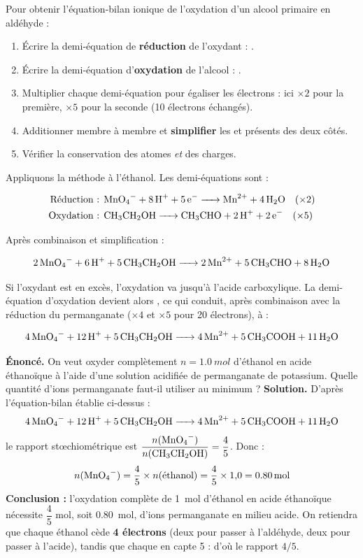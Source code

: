 \documentclass[11pt]{article}
\begin{document}
\begin{methode}
Pour obtenir l'équation-bilan ionique de l'oxydation d'un alcool primaire en aldéhyde :
\begin{enumerate}
\item Écrire la demi-équation de \textbf{réduction} de l'oxydant : .
\item Écrire la demi-équation d'\textbf{oxydation} de l'alcool : .
\item Multiplier chaque demi-équation pour égaliser les électrons : ici $\times 2$ pour la première, $\times 5$ pour la seconde (10 électrons échangés).
\item Additionner membre à membre et \textbf{simplifier} les  et  présents des deux côtés.
\item Vérifier la conservation des atomes \emph{et} des charges.
\end{enumerate}
\end{methode}

Appliquons la méthode à l'éthanol. Les demi-équations sont :

\begin{align*}
\text{Réduction : } & \ce{MnO4- + 8H+ + 5e- -> Mn^2+ + 4H2O} \quad (\times 2)\\
\text{Oxydation : } & \ce{CH3CH2OH -> CH3CHO + 2H+ + 2e-} \quad (\times 5)
\end{align*}

Après combinaison et simplification :

\[ \ce{2MnO4- + 6H+ + 5CH3CH2OH -> 2Mn^2+ + 5CH3CHO + 8H2O} \]

Si l'oxydant est en excès, l'oxydation va jusqu'à l'acide carboxylique. La demi-équation d'oxydation devient alors , ce qui conduit, après combinaison avec la réduction du permanganate ($\times 4$ et $\times 5$ pour 20 électrons), à :

\[ \ce{4MnO4- + 12H+ + 5CH3CH2OH -> 4Mn^2+ + 5CH3COOH + 11H2O} \]

\begin{exoresolu}
\textbf{Énoncé.} On veut oxyder complètement $n = \SI{1,0}{mol}$ d'éthanol en acide éthanoïque à l'aide d'une solution acidifiée de permanganate de potassium. Quelle quantité d'ions permanganate  faut-il utiliser au minimum ?
\tcblower
\textbf{Solution.} D'après l'équation-bilan établie ci-dessus :
\[ \ce{4MnO4- + 12H+ + 5CH3CH2OH -> 4Mn^2+ + 5CH3COOH + 11H2O} \]
le rapport stœchiométrique est $\dfrac{n(\ce{MnO4-})}{n(\ce{CH3CH2OH})} = \dfrac{4}{5}$. Donc :
\[ n(\ce{MnO4-}) = \frac{4}{5} \times n(\text{éthanol}) = \frac{4}{5} \times 1{,}0 = \SI{0,80}{mol} \]
\textbf{Conclusion :} l'oxydation complète de \SI{1}{mol} d'éthanol en acide éthanoïque nécessite $\dfrac{4}{5}$ mol, soit \SI{0,80}{mol}, d'ions permanganate en milieu acide. On retiendra que chaque éthanol cède \textbf{4 électrons} (deux pour passer à l'aldéhyde, deux pour passer à l'acide), tandis que chaque  en capte 5 : d'où le rapport $4/5$.
\end{exoresolu}
\end{document}
